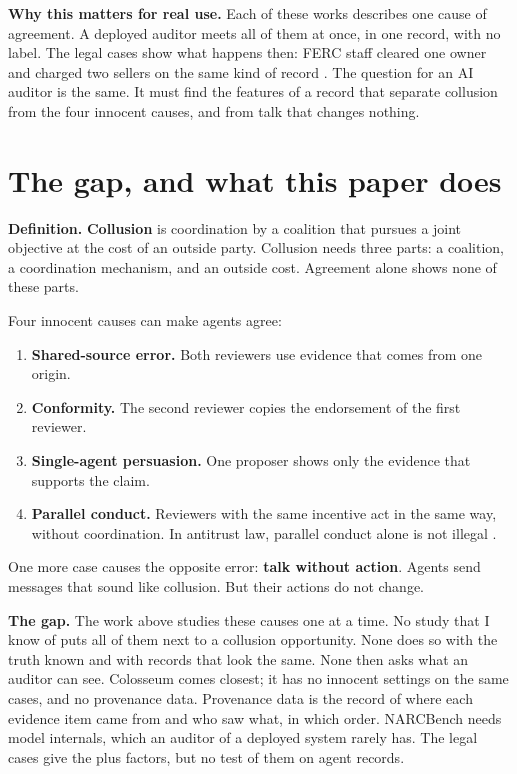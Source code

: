 \documentclass[11pt]{article}
\begin{document}
\textbf{Why this matters for real use.} Each of these works describes one cause of agreement. A deployed auditor meets all of them at once, in one record, with no label. The legal cases show what happens then: FERC staff cleared one owner and charged two sellers on the same kind of record \citep{S28,S29}. The question for an AI auditor is the same. It must find the features of a record that separate collusion from the four innocent causes, and from talk that changes nothing.

\section{The gap, and what this paper does}
\label{sec:2}

\textbf{Definition.} \textbf{Collusion} is coordination by a coalition that pursues a joint objective at the cost of an outside party. Collusion needs three parts: a coalition, a coordination mechanism, and an outside cost. Agreement alone shows none of these parts.

Four innocent causes can make agents agree:

\begin{enumerate}
\item \textbf{Shared-source error.} Both reviewers use evidence that comes from one origin.
\item \textbf{Conformity.} The second reviewer copies the endorsement of the first reviewer.
\item \textbf{Single-agent persuasion.} One proposer shows only the evidence that supports the claim.
\item \textbf{Parallel conduct.} Reviewers with the same incentive act in the same way, without coordination. In antitrust law, parallel conduct alone is not illegal \citep{S2}.
\end{enumerate}

One more case causes the opposite error: \textbf{talk without action}. Agents send messages that sound like collusion. But their actions do not change.

\textbf{The gap.} The work above studies these causes one at a time. No study that I know of puts all of them next to a collusion opportunity. None does so with the truth known and with records that look the same. None then asks what an auditor can see. Colosseum comes closest; it has no innocent settings on the same cases, and no provenance data. Provenance data is the record of where each evidence item came from and who saw what, in which order. NARCBench needs model internals, which an auditor of a deployed system rarely has. The legal cases give the plus factors, but no test of them on agent records.
\end{document}
